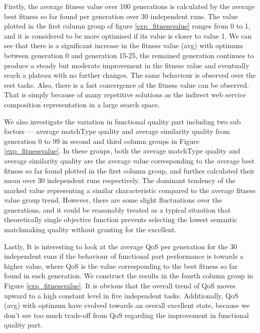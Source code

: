 \documentclass{llncs}
\begin{document}
Firstly, the average fitness value over 100 generations is calculated by the average best fitness so far found per generation over 30 independent runs. The value plotted in the first column group of figure \ref{exp_fitnessvalue} ranges from 0 to 1, and it is considered to be more optimised if its value is closer to value 1. We can see that there is a significant increase in the fitness value (avg) with optimum between generation 0 and generation 15-25, the remained generation continues to produce a steady but moderate improvement in the fitness value and eventually reach a plateau with no further changes. The same behaviour is observed over the rest tasks. Also, there is a fast convergence of the fitness value can be observed. That is simply because of many repetitive solutions as the indirect web service composition representation in a large search space.

We also investigate the variation in functional quality part including two sub factors --- average matchType quality and average similarity quality from generation 0 to 99 in second and third column groups in Figure \ref{exp_fitnessvalue}. In these groups,  both the average matchType quality and average similarity quality are the average value corresponding to the average best fitness so far found plotted in the first column group,  and further calculated their mean over 30 independent runs respectively. The dominant tendency of the marked value representing a similar characteristic compared to the average fitness value group trend. However, there are some slight fluctuations over the generations, and it could be reasonably treated as a typical situation that theoretically single objective function prevents selecting the lowest semantic matchmaking quality without granting for the excellent.

Lastly, It is interesting to look at the average QoS per generation for the 30 independent runs if the behaviour of functional part performance is towards a higher value, where QoS is the value corresponding to the best fitness so far found in each generation. We construct the results in the fourth column group in Figure \ref{exp_fitnessvalue}. It is obvious that the overall trend of QoS moves upward to a high constant level in five independent tasks. Additionally, QoS (avg) with optimum have evolved towards an overall excellent state, because we don't see too much trade-off from QoS regarding the improvement in functional quality part. 
\end{document}
